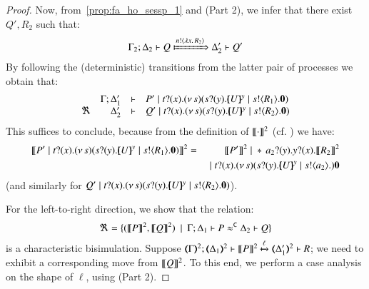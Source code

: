 \begin{proof}
		{}
		{}
		{\fwb}
		{}
		{}
		{}

	\noi Now, from~\eqref{prop:fa_ho_sessp_1} and   (Part 2), we infer that
	there exist $Q', R_2$ such that:
%
	\begin{eqnarray*}
		\Gamma_2; \Delta_2 \proves Q \Hby{\bactout{n}{\abs{x}{R_2}}} \Delta_2' \proves Q'
	\end{eqnarray*}
%
	By following the (deterministic) transitions from the latter pair of processes we obtain that:
%	
%
	$$
	\mhorel	{\Gamma}
		{\Delta_1'}
		{P' \Par \binp{t}{x} \newsp{s}{ \binp{s}{y} \mapchar{U}{y} \Par \bout{s}{R_1} \inact }}
		{\Re}
		{\Delta_2'}
		{}
		{Q' \Par \binp{t}{x} \newsp{s}{ \binp{s}{y} \mapchar{U}{y} \Par \bout{s}{R_2} \inact } }
	$$
	This suffices to conclude, because from the definition of $\llbracket\cdot\rrbracket^2$ (cf. ) we have:
	\begin{eqnarray*}
		\pmap{P' \Par \binp{t}{x} \newsp{s}{ \binp{s}{y} \mapchar{U}{y} \Par \bout{s}{R_1} \inact}}{2}  & = &
		\pmap{P'}{2} \Par \repl \binp{a_2}{y} \binp{y}{x} \pmap{R_2}{2} \\ & & \Par \binp{t}{x} \newsp{s}{ \binp{s}{y} \mapchar{U}{y} \Par \bout{s}{a_2}} \inact
	\end{eqnarray*}
	(and similarly for $Q' \;|\; t ? (x) . (\nu\, s)( s ? (y) . [\!\!(U)\!\!]^{y} \;|\; s ! \langle R_2 \rangle . \mathbf{0} ) $).

\bigskip

	\noi For the left-to-right direction, we show that the relation:
	\[
		\Re = \{ 
		(\llbracket P\rrbracket^2, \llbracket Q\rrbracket^2)
		\ \ |\ \  \Gamma; \Delta_1 \vdash P \approx^\mathtt{C} \Delta_2 \vdash Q\}
	\]
%
	 is a characteristic bisimulation.
Suppose %
$\stytra{\mapt{\Gamma}^{2}}{\ell}{\mapt{\Delta_1}^{2}}{\map{P}^{2}}{\mapt{\Delta_1'}^{2}}{R}$;
we need to exhibit a corresponding move from $\llbracket Q\rrbracket^{2}$.
To this end, we perform a case analysis on the shape of ${\ell}$, using 
 (Part 2).


\end{proof}
